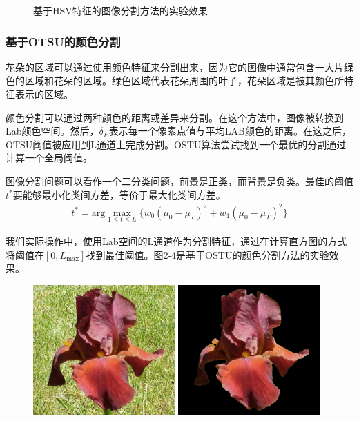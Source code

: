 \documentclass[supercite]{HustGraduPaper}
\begin{document}
\begin{sloppypar}
\begin{figure}[H]
    \caption{基于HSV特征的图像分割方法的实验效果}
    \end{figure}
  \subsubsection{基于OTSU的颜色分割}
  花朵的区域可以通过使用颜色特征来分割出来\cite{6968612}，因为它的图像中通常包含一大片绿色的区域和花朵的区域。绿色区域代表花朵周围的叶子，花朵区域是被其颜色所特征表示的区域。

  颜色分割可以通过两种颜色的距离或差异来分割。在这个方法中，图像被转换到Lab颜色空间。然后，$\delta_E$表示每一个像素点值与平均LAB颜色的距离。在这之后，OTSU阈值被应用到L通道上完成分割。OSTU算法尝试找到一个最优的分割通过计算一个全局阈值\cite{t2}。

  图像分割问题可以看作一个二分类问题，前景是正类，而背景是负类。最佳的阈值$t^*$要能够最小化类间方差，等价于最大化类间方差。\begin{gather}
    t^*=\text{arg}\max_{1\leq t\leq L}\{ w_0(\mu_0-\mu_T)^2+w_1(\mu_0-\mu_T)^2 \}
  \end{gather}

  我们实际操作中，使用Lab空间的L通道作为分割特征，通过在计算直方图的方式将阈值在$[0,L_{\text{max}}]$找到最佳阈值。图2-4是基于OSTU的颜色分割方法的实验效果。
  \begin{figure}[H]
    \setlength{\abovecaptionskip}{0.2cm}
    \setlength{\belowcaptionskip}{-0.2cm}
    \centering%
      {\includegraphics[height=5cm]{6.jpg}}%
    \hspace{2em}%
        {\includegraphics[height=5cm]{7.jpg}}
  

\end{figure}
\end{sloppypar}
\end{document}
